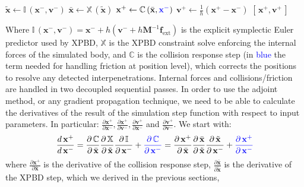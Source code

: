 \documentclass{article}
\newcommand{\der}[2]{\dfrac{d\, #1}{d\, #2}}
\newcommand{\pd}[2]{\dfrac{\partial\, #1}{\partial\, #2}}
\newcommand{\pdc}[2]{\frac{\partial #1}{\partial #2}}
\newcommand{\blue}[1]{\textcolor{blue}{#1}}
\begin{document}
\begin{algorithm}[H]
\caption{Single differentiable simulation step: explicit integration, XPBD constraint solve, and collision response.}
\label{alg:}
\begin{algorithmic}[1]
\addtolength{\itemsep}{0.5ex}
    \State $\tilde{\mathbf{x}} \gets \mathbb{I}\,(\mathbf{x}^-, \mathbf{v}^-)$
    \State $\bar{\mathbf{x}} \gets \mathbb{X}\,(\tilde{\mathbf{x}})$
    \State $\mathbf{x}^+ \gets \mathbb{C}\,(\bar{\mathbf{x}}, \blue{\mathbf{x}^-})$
    \State $\mathbf{v}^+ \gets \frac{1}{h}(\mathbf{x}^+ - \mathbf{x}^-)$
    \State \Return $[\,\mathbf{x}^+, \mathbf{v}^+\,]$
\EndFunction
\end{algorithmic}
\end{algorithm}
Where $\mathbb{I}\,(\mathbf{x}^-, \mathbf{v}^-) = \mathbf{x}^- + h(\mathbf{v}^- + h\mathbf{M}^{-1}\mathbf{f}_{\text{ext}})$ is the explicit symplectic Euler predictor used by XPBD, $\mathbb{X}$ is the XPBD constraint solve enforcing the internal forces of the simulated body, and $\mathbb{C}$ is the collision response step (in \blue{blue} the term needed for handling friction at position level), which corrects the positions to resolve any detected interpenetrations. Internal forces and collisions/friction are handled in two decoupled sequential passes.
\newline In order to use the adjoint method, or any gradient propagation technique, we need to be able to calculate the derivatives of the result of the simulation step function with respect to input parameters. In particular: $\pdc{\mathbf{x}^+}{\mathbf{x}^-}, \pdc{\mathbf{x}^+}{\mathbf{v}^-}, \pdc{\mathbf{v}^+}{\mathbf{x}^-}$ and $\pdc{\mathbf{v}^+}{\mathbf{v}^-}$. We start with:
\begin{equation}
    \der{\mathbf{x}^+}{\mathbf{x}^-} = 
        \pd{\mathbb{C}}{\bar{\mathbf{x}}}
        \pd{\mathbb{X}}{\tilde{\mathbf{x}}}
        \pd{\mathbb{I}}{{\mathbf{x}^-}}
        + \blue{\pd{\mathbb{C}}{\mathbf{x}^-}}
        =
        \pd{\mathbf{x}^+}{\bar{\mathbf{x}}}
        \pd{\bar{\mathbf{x}}}{\tilde{\mathbf{x}}}
        \pd{\tilde{\mathbf{x}}}{\mathbf{x}^-}
        + 
        \blue{\pd{\mathbf{x}^+}{\mathbf{x}^-}}
\end{equation}
where $\pdc{\mathbf{x}^+}{\bar{\mathbf{x}}}$ is the derivative of the collision response step, $\pdc{\bar{\mathbf{x}}}{\tilde{\mathbf{x}}}$ is the derivative of the XPBD step, which we derived in the previous sections, 
\end{document}
